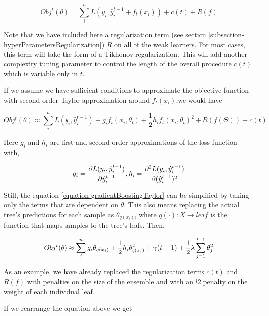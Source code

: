 \documentclass{article}%
\theoremstyle{definition}
\begin{document}
\begin{equation}
Obj^t(\theta) =  \sum_i^n L(y_i, \hat{y}^{t-1}_i +  f_t(x_i) ) + c(t) + R(f) 
\end{equation}


Note that we have included here a regularization term (see section \ref{subsection-hyperParametersRegularization}) $R$ on all of the weak learners. For most cases,  this term will take the form of a Tikhonov regularization. This will add another complexity tuning parameter to control the length of the overall procedure $c(t)$ which is variable only in $t$. 

If we assume we have sufficient conditions to approximate the objective function with second order Taylor approximation around $f_t(x_i)$,we would have

\begin{equation}\label{equation-gradientBoostingTaylor}
Obj^t(\theta) \approx \sum_i^n {L(y_i, \hat{y}^{t-1}_i) + g_i f_t(x_i,\theta_t) + \frac{1}{2} h_i f_t(x_i,\theta_t)^2 } +  R(f(\Theta)) +  c(t)
\end{equation}

Here $g_i$ and $h_i$ are first and second order approximations of the loss function with,

\[
g_i =  \frac{\partial L(y_i, \hat{y}^{t-1}_i)}{\partial \hat{y}^{t-1}_i}, \  \\
h_i =  \frac{\partial^2 L(y_i, \hat{y}^{t-1}_i)}{\partial (\hat{y}^{t-1}_i)^2 }
\]

Still, the equation \ref{equation-gradientBoostingTaylor} can be simplified by taking only the terms that are dependent on $\theta$. This also means replacing the actual tree's predictions for each sample as $\theta_{q(x_i)}$, where $q(\cdot): X \rightarrow leaf$ is the function that maps samples to the tree's leafs. Then,


\begin{equation} \label{eq:gb-objSteps1}
Obj^t(\theta) \approx  \sum_i^n {g_i \theta_{q(x_i)} + \frac{1}{2} h_i \theta_{q(x_i)}^2 } + \gamma ({t-1}) + \frac{1}{2}\lambda \sum_{j=1}^{t-1} \theta_j^2 \\
\end{equation}

As an example, we have already replaced the regularization terms $c(t)$ and $R(f)$ with penalties on the size of the ensemble and with an $l$2 penalty on the weight of each individual leaf. 

If we rearrange the equation above we get
\end{document}
